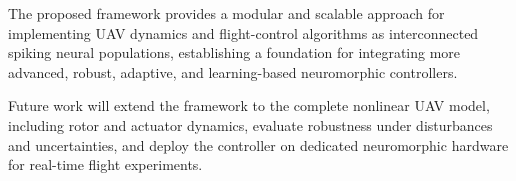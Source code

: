 \documentclass[conference]{IEEEtran}
\begin{document}
The proposed framework provides a modular and scalable approach for implementing UAV dynamics and flight-control algorithms as interconnected spiking neural populations, establishing a foundation for integrating more advanced, robust, adaptive, and learning-based neuromorphic controllers.

Future work will extend the framework to the complete nonlinear UAV model, including rotor and actuator dynamics, evaluate robustness under disturbances and uncertainties, and deploy the controller on dedicated neuromorphic hardware for real-time flight experiments.




\end{document}

